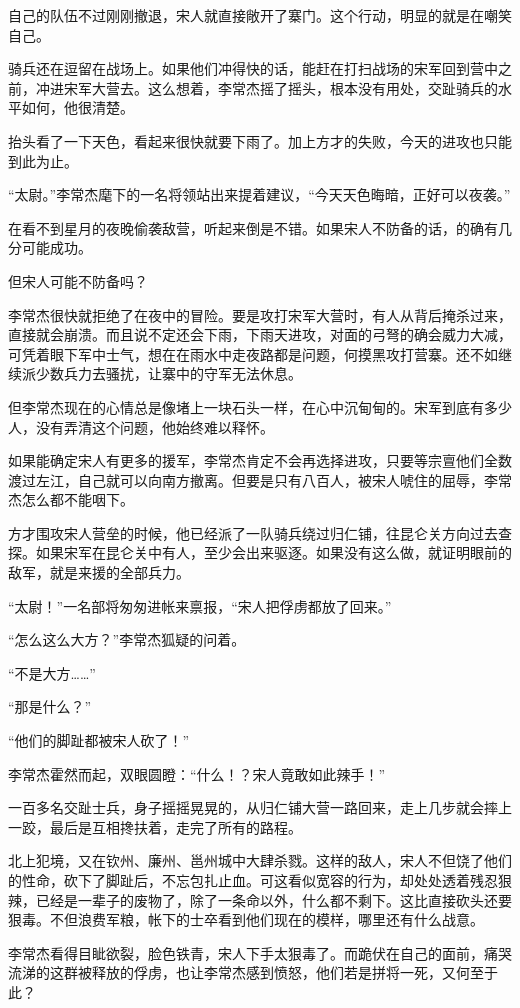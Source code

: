 自己的队伍不过刚刚撤退，宋人就直接敞开了寨门。这个行动，明显的就是在嘲笑自己。

骑兵还在逗留在战场上。如果他们冲得快的话，能赶在打扫战场的宋军回到营中之前，冲进宋军大营去。这么想着，李常杰摇了摇头，根本没有用处，交趾骑兵的水平如何，他很清楚。

抬头看了一下天色，看起来很快就要下雨了。加上方才的失败，今天的进攻也只能到此为止。

“太尉。”李常杰麾下的一名将领站出来提着建议，“今天天色晦暗，正好可以夜袭。”

在看不到星月的夜晚偷袭敌营，听起来倒是不错。如果宋人不防备的话，的确有几分可能成功。

但宋人可能不防备吗？

李常杰很快就拒绝了在夜中的冒险。要是攻打宋军大营时，有人从背后掩杀过来，直接就会崩溃。而且说不定还会下雨，下雨天进攻，对面的弓弩的确会威力大减，可凭着眼下军中士气，想在在雨水中走夜路都是问题，何摸黑攻打营寨。还不如继续派少数兵力去骚扰，让寨中的守军无法休息。

但李常杰现在的心情总是像堵上一块石头一样，在心中沉甸甸的。宋军到底有多少人，没有弄清这个问题，他始终难以释怀。

如果能确定宋人有更多的援军，李常杰肯定不会再选择进攻，只要等宗亶他们全数渡过左江，自己就可以向南方撤离。但要是只有八百人，被宋人唬住的屈辱，李常杰怎么都不能咽下。

方才围攻宋人营垒的时候，他已经派了一队骑兵绕过归仁铺，往昆仑关方向过去查探。如果宋军在昆仑关中有人，至少会出来驱逐。如果没有这么做，就证明眼前的敌军，就是来援的全部兵力。

“太尉！”一名部将匆匆进帐来禀报，“宋人把俘虏都放了回来。”

“怎么这么大方？”李常杰狐疑的问着。

“不是大方……”

“那是什么？”

“他们的脚趾都被宋人砍了！”

李常杰霍然而起，双眼圆瞪：“什么！？宋人竟敢如此辣手！”

一百多名交趾士兵，身子摇摇晃晃的，从归仁铺大营一路回来，走上几步就会摔上一跤，最后是互相搀扶着，走完了所有的路程。

北上犯境，又在钦州、廉州、邕州城中大肆杀戮。这样的敌人，宋人不但饶了他们的性命，砍下了脚趾后，不忘包扎止血。可这看似宽容的行为，却处处透着残忍狠辣，已经是一辈子的废物了，除了一条命以外，什么都不剩下。这比直接砍头还要狠毒。不但浪费军粮，帐下的士卒看到他们现在的模样，哪里还有什么战意。

李常杰看得目眦欲裂，脸色铁青，宋人下手太狠毒了。而跪伏在自己的面前，痛哭流涕的这群被释放的俘虏，也让李常杰感到愤怒，他们若是拼将一死，又何至于此？

